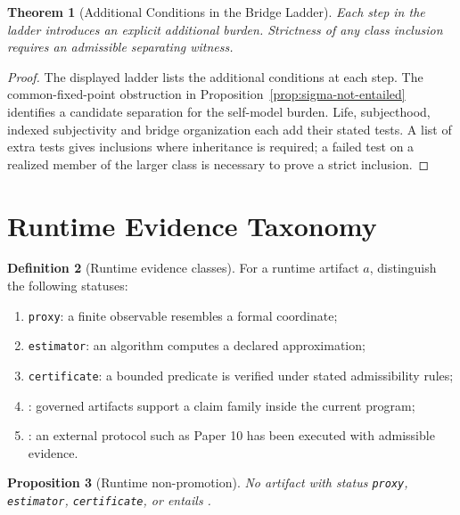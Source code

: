 \documentclass[11pt,a4paper]{article}
\newtheorem{theorem}{Theorem}[section]
\newtheorem{proposition}[theorem]{Proposition}
\theoremstyle{definition}
\newtheorem{definition}[theorem]{Definition}
\begin{document}
\begin{theorem}[Additional Conditions in the Bridge Ladder]\label{thm:bridge-ladder-strict}
Each step in the ladder introduces an explicit additional burden. Strictness of any class inclusion requires an admissible separating witness.
\end{theorem}

\begin{proof}
The displayed ladder lists the additional conditions at each step. The common-fixed-point obstruction in Proposition~\ref{prop:sigma-not-entailed} identifies a candidate separation for the self-model burden. Life, subjecthood, indexed subjectivity and bridge organization each add their stated tests. A list of extra tests gives inclusions where inheritance is required; a failed test on a realized member of the larger class is necessary to prove a strict inclusion.
\end{proof}

\section{Runtime Evidence Taxonomy}

\begin{definition}[Runtime evidence classes]\label{def:runtime-evidence-classes}
For a runtime artifact $a$, distinguish the following statuses:
\begin{enumerate}[leftmargin=1.5em]
\item \texttt{proxy}: a finite observable resembles a formal coordinate;
\item \texttt{estimator}: an algorithm computes a declared approximation;
\item \texttt{certificate}: a bounded predicate is verified under stated
admissibility rules;
\item \texttt{\allowbreak{}}: governed artifacts support a claim family
inside the current program;
\item \texttt{\allowbreak{}\allowbreak{}}: an external protocol such as Paper 10 has
been executed with admissible evidence.
\end{enumerate}
\end{definition}

\begin{proposition}[Runtime non-promotion]\label{prop:runtime-non-promotion}
No artifact with status \texttt{proxy}, \texttt{estimator},
\texttt{certificate}, or \texttt{\allowbreak{}} entails
\texttt{\allowbreak{}\allowbreak{}}.
\end{proposition}
\end{document}
